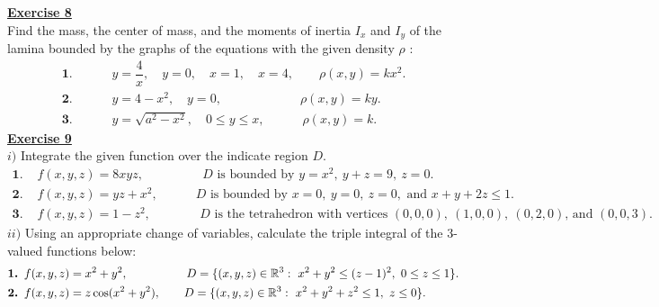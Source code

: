\noindent\Large{\underline{\textbf{Exercise 8}}}
\normalsize{}\\
\noindent Find the mass, the center of mass, and the moments of inertia $I_x$ and $I_y$ of
                                the lamina bounded by the graphs of the equations with the given density $\rho$ :
\begin{align*}
    \textbf{1. }& \qquad y = \dfrac{4}{x},\quad y = 0,\quad x = 1,\quad x = 4, \qquad \rho(x,y) = kx^2.\\
    \textbf{2. }& \qquad y = 4 - x^2,\quad y = 0, \qquad \qquad \qquad\ \rho(x,y) = ky.\\
    \textbf{3. }& \qquad y = \sqrt{a^2 - x^2},\quad 0 \leq y \leq x, \qquad \quad \rho(x,y) = k.
\end{align*}
\noindent\Large{\underline{\textbf{Exercise 9}}}
\normalsize{}\\
\noindent $i)$ Integrate the given function over the indicate region $D$.
\begin{align*}
    \textbf{1. }& f(x,y,z) = 8xyz,     \qquad \qquad \text{ $D$ is bounded by $y = x^2,\ y + z = 9,\ z = 0$.} \\
    \textbf{2. }& f(x,y,z) = yz + x^2, \qquad \quad \text{$D$ is bounded
                                                    by $x= 0,\ y = 0,\ z = 0,$ and $x + y + 2z \leq 1$.} \\
    \textbf{3. }& f(x,y,z) = 1 - z^2,  \qquad \quad \ \text{ $D$ is
                                the tetrahedron with vertices $(0,0,0),\ (1,0,0),\ (0,2,0)$, and $(0,0,3)$.}
\end{align*}
\noindent $ii)$ Using an appropriate change of variables, calculate the triple integral of the 3-valued functions below:
\begin{align*}
    \textbf{1. }& f(x,y,z) = x^2 + y^2,  \qquad \qquad \quad \text{$D = 
                                                        \{(x,y,z)\in \mathbb{R}^3:\ x^2 + y^2 \leq (z - 1)^2,\ 0\leq z\leq 1\}$.}\\
    \textbf{2. }& f(x,y,z) = z\cos(x^2 + y^2),  \qquad \text{$D = 
                                                        \{(x,y,z)\in \mathbb{R}^3:\ x^2 + y^2 + z^2 \leq 1,\ z \leq 0\}$.}
\end{align*}

